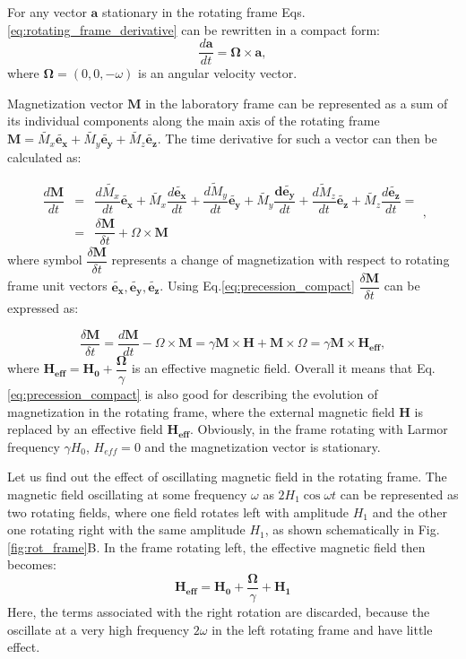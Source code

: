 \documentclass[a4paper, 12pt]{article}
\begin{document}
For any vector $\bm{a}$ stationary in the rotating frame Eqs.\ref{eq:rotating_frame_derivative} can be rewritten in a compact form:
\begin{equation}
\dfrac{d\bm{a}}{dt} = \bm{\Omega} \times \bm{a},
\end{equation}
where $\bm{\Omega} = (0,0, -\omega)$ is an angular velocity vector.

Magnetization vector $\bm{M}$ in the laboratory frame can be represented as a sum of its individual components along the main axis of the rotating frame $\bm{M} = \tilde{M_x} \bm{\tilde{e_x}} + \tilde{M_y} \bm{\tilde{e_y}}+ \tilde{M_z} \bm{\tilde{e_z}}$.  The time derivative for such a vector can then be calculated as:

\begin{equation}
\begin{array} {lcl}
\dfrac{d\bm{M}}{dt} &=& \dfrac{d\tilde{M_x}}{dt} \bm{\tilde{e_x}} + \tilde{M_x} \dfrac{d\bm{\tilde{e_x}}}{dt} + \dfrac{\tilde{dM_y}}{dt} \bm{\tilde{e_y}} + \tilde{M_y} \dfrac{\bm{d\tilde{e_y}}}{dt} + \dfrac{\tilde{dM_z}}{dt} \bm{\tilde{e_z}} + \tilde{M_z} \dfrac{d\bm{\tilde{e_z}}}{dt} = \\
 &=& \dfrac{\delta \bm{M}}{\delta t} + \Omega \times \bm{M}
\end{array},
\end{equation}
where symbol $\dfrac{\delta \bm{M}}{\delta t}$ represents a change of magnetization with respect to rotating frame unit vectors $\bm{\tilde{e_x}}, \bm{\tilde{e_y}}, \bm{\tilde{e_z}}$. Using  Eq.\ref{eq:precession_compact} $\dfrac{\delta \bm{M}}{\delta t}$ can be expressed as:

\begin{equation}
\dfrac{\delta \bm{M}}{\delta t} = \dfrac{d\bm{M}}{dt} - \Omega \times \bm{M} = \gamma \bm{M} \times \bm{H} + \bm{M} \times \Omega = \gamma \bm{M} \times \bm{H_{eff}},
\end{equation}
where  $\bm {H_{eff}} = \bm{H_0} + \dfrac{\bm {\Omega}}{\gamma}$ is an effective magnetic field. Overall it means that Eq.\ref{eq:precession_compact} is also good for describing the evolution of magnetization in the rotating frame, where the external magnetic field $\bm{H}$ is replaced by an effective field $\bm {H_{eff}}$. Obviously, in the frame rotating with Larmor frequency $\gamma H_0 $,  $H_{eff}=0$ and the magnetization vector is stationary.

 Let us find out the effect of oscillating magnetic field in the rotating frame. The magnetic field oscillating at some frequency $\omega$ as $ 2 H_1 \cos \omega t $ can be represented as two rotating fields, where one field rotates left with amplitude $H_1$ and the other one rotating right with the same amplitude $H_1$, as shown schematically in Fig.\ref{fig:rot_frame}B. In the frame rotating left, the effective magnetic field then becomes:
\begin{equation} \label{eq:H_eff}
\bm{H_{eff}} = \bm{H_0} + \dfrac{\bm{\Omega}}{\gamma} + \bm{H_1}
\end{equation}
Here, the terms associated with the right rotation are discarded, because the oscillate at a very high frequency $2 \omega$ in the left rotating frame and have little effect.
\end{document}
